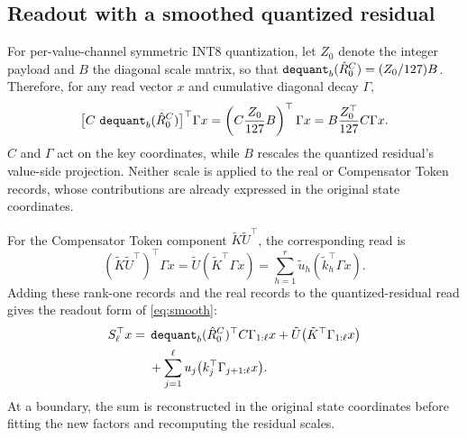 \subsection{Readout with a smoothed quantized residual}
\label{app:smoothing}

For per-value-channel symmetric INT8 quantization, let $Z_0$ denote the integer payload and $B$ the diagonal scale matrix, so that $\operatorname{\mathtt{dequant}}_b(\hat R_0^C)=(Z_0/127)B$.
Therefore, for any read vector $x$ and cumulative diagonal decay $\Gamma$,
\begin{equation*}
  \bigl[C\,\operatorname{\mathtt{dequant}}_b(\hat R_0^C)\bigr]^{\top}\Gamma x
    =\left(C\frac{Z_0}{127}B\right)^{\top}\Gamma x
    =B\frac{Z_0^{\top}}{127}C\Gamma x.
\end{equation*}
$C$ and $\Gamma$ act on the key coordinates, while $B$ rescales the quantized residual's value-side projection.
Neither scale is applied to the real or Compensator Token records, whose contributions are already expressed in the original state coordinates.

For the Compensator Token component $\tilde K\tilde U^{\top}$, the corresponding read is
\begin{equation*}
  (\tilde K\tilde U^{\top})^{\top}\Gamma x
    =\tilde U(\tilde K^{\top}\Gamma x)
    =\sum_{h=1}^{r}\tilde u_h(\tilde k_h^{\top}\Gamma x).
\end{equation*}
Adding these rank-one records and the real records to the quantized-residual read gives the readout form of \eqref{eq:smooth}:
\begin{equation}
  \begin{aligned}
    S_\ell^{\top}x
      ={}&\operatorname{\mathtt{dequant}}_b(\hat R_0^C)^{\top}C\Gamma_{1:\ell}x
        +\tilde U\bigl(\tilde K^{\top}\Gamma_{1:\ell}x\bigr)\\
       &+\sum_{j=1}^{\ell}u_j\bigl(k_j^{\top}\Gamma_{j+1:\ell}x\bigr).
  \end{aligned}
  \label{eq:smooth-readout}
\end{equation}
At a boundary, the sum is reconstructed in the original state coordinates before fitting the new factors and recomputing the residual scales.
